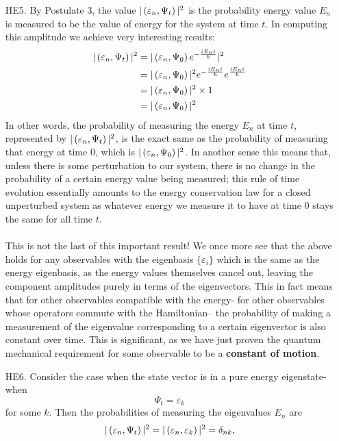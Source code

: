 \begin{enumerate}
    \item[HE5.] By Postulate 3, the value $|\left(\varepsilon_{n},\Psi_{t}\right)|^2$ is the probability energy value $E_{n}$ is measured to be the value of energy for the system at time $t$. In computing this amplitude we achieve very interesting results:
    $$
    \begin{aligned}
    |\left(\varepsilon_{n},\Psi_{t}\right)|^2 &=  |\left(\varepsilon_{n},\Psi_{0}\right)e^{-\frac{iE_{n}t}{\hbar}}|^2\\
    &=|\left(\varepsilon_{n},\Psi_{0}\right)|^2e^{-\frac{iE_{n}t}{\hbar}}e^{\frac{iE_{n}t}{\hbar}}\\
    &=|\left(\varepsilon_{n},\Psi_{0}\right)|^2\times 1\\
    &=|\left(\varepsilon_{n},\Psi_{0}\right)|^2
    \end{aligned}
    $$
    In other words, the probability of measuring the energy $E_{n}$ at time $t$, represented by $|\left(\varepsilon_{n},\Psi_{t}\right)|^2$, is the exact same as the probability of measuring that energy at time 0, which is $|\left(\varepsilon_{n},\Psi_{0}\right)|^2$. In another sense this means that, unless there is some perturbation to our system, there is no change in the probability of a certain energy value being measured; this rule of time evolution essentially amounts to the energy conservation law for a closed unperturbed system as whatever energy we measure it to have at time 0 stays the same for all time $t$.
    \\\\
    This is not the last of this important result! We once more see that the above holds for any observables with the eigenbasis $\{\varepsilon_{i}\}$ which is the same as the energy eigenbasis, as the energy values themselves cancel out, leaving the component amplitudes purely in terms of the eigenvectors. This in fact means that for other observables compatible with the energy- for other observables whose operators commute with the Hamiltonian-- the probability of making a measurement of the eigenvalue corresponding to a certain eigenvector is also constant over time. This is significant, as we have just proven the quantum mechanical requirement for some observable to be a \textbf{constant of motion}.
    \item[HE6.] Consider the case when the state vector is in a pure energy eigenstate- when 
    $$
    \Psi_{t}=\varepsilon_{k}
    $$
    for some $k$. Then the probabilities of measuring the eigenvalues $E_{n}$ are 
    $$
    |\left(\varepsilon_{n},\Psi_{t}\right)|^{2}=|\left(\varepsilon_{n},\varepsilon_{k}\right)|^{2}=\delta_{nk},
$$
\end{enumerate}
